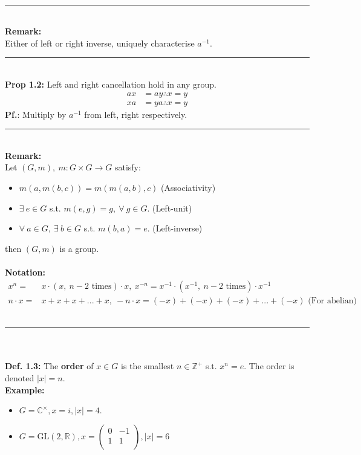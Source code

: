 \documentclass{article}
\begin{document}
\vspace{3mm}~\\
\hrule
\vspace{3mm}~\\
\textbf{Remark:}\\
Either of left or right inverse, uniquely characterise $a^{-1}$.
\vspace{2mm}~\\
\hrule
\vspace{3mm}~\\
\textbf{Prop 1.2:} Left and right cancellation hold in any group.
\begin{align}
ax&=ay\therefore x=y\\
xa&=ya\therefore x=y
\end{align}
\textbf{Pf.}: Multiply by $a^{-1}$ from left, right respectively.
\vspace{3mm}~\\
\hrule
\vspace{3mm}~\\
\textbf{Remark:}\\
Let  $(G, m),~m:G\times G \rightarrow G$ satisfy:
\begin{itemize}
\item $m(a, m(b,c))=m(m(a,b),c)$ (Associativity)
\item $\exists~e\in G$ s.t. $m(e,g)=g,~\forall~g\in G$. (Left-unit)
\item $\forall ~ a \in G,~\exists~b\in G$ s.t. $m(b,a)=e$. (Left-inverse)
\end{itemize}
then $(G,m)$ is a group.\\
\vspace{2mm}~\\
\textbf{Notation:}\\
\begin{align}
x^n=&x\cdot (x, ~ n-2 \text{ times}) \cdot x,~x^{-n}=x^{-1}\cdot (x^{-1}, ~ n-2 \text{ times}) \cdot x^{-1}\\
n\cdot x=&x+x+x+...+x,~-n\cdot x = (-x)+(-x)+(-x)+...+(-x) \text{ (For abelian)}
\end{align}
\vspace{3mm}~\\
\hrule
\vspace{3mm}~\\
\newpage
~\\
\textbf{Def. 1.3:} The \textbf{order} of $x\in G$ is the smallest $n\in \mathbb{Z}^+$ s.t. $x^n=e$. The order is denoted $|x|= n$.
\vspace{2mm}~\\
\textbf{Example:}
\begin{itemize}
\item $G=\mathbb{C}^{\times}, x=i, |x|=4.$
\item $G=\mathrm{GL}(2,\mathbb{R}), x=\begin{pmatrix}0&-1\\1&1\\\end{pmatrix}, |x|=6$
\end{itemize}
\newpage
\end{document}
